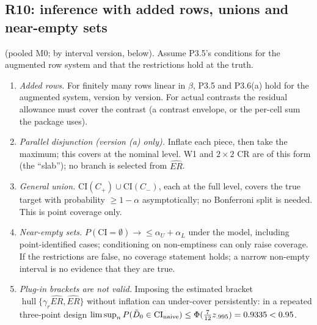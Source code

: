 \subsection{R10: inference with added rows, unions and near-empty sets}

\begin{result}\label{res:r10}
 (pooled M0; by interval version, below). Assume
P3.5's conditions for the augmented row system and that the restrictions hold at
the truth.
\begin{enumerate}[label=(\alph*),nosep]
\item \emph{Added rows.} For finitely many rows linear in $\beta$, P3.5 and
P3.6(a) hold for the augmented system, version by version. For actual contrasts
the residual allowance must cover the contrast (a contrast envelope, or the
per-cell sum the package uses).
\item \emph{Parallel disjunction (version (a) only).} Inflate each piece, then take
the maximum; this covers at the nominal level. W1 and $2\times2$ CR are of this
form (the ``slab''); no branch is selected from $\widehat{ER}$.
\item \emph{General union.} $\mathrm{CI}(C_+)\cup\mathrm{CI}(C_-)$, each at the
full level, covers the true target with probability $\ge1-\alpha$ asymptotically;
no Bonferroni split is needed. This is point coverage only.
\item \emph{Near-empty sets.} $P(\mathrm{CI}=\emptyset)\to\le\alpha_U+\alpha_L$
under the model, including point-identified cases; conditioning on non-emptiness
can only raise coverage. If the restrictions are false, no coverage statement
holds; a narrow non-empty interval is no evidence that they are true.
\item \emph{Plug-in brackets are not valid.} Imposing the estimated bracket
$\operatorname{hull}\{\gamma_r\widehat{ER},\widehat{ER}\}$ without inflation can
under-cover persistently: in a repeated three-point design
$\limsup_nP(\tilde D_0\in\mathrm{CI}_{\rm naive})\le\Phi(\tfrac7{12}z_{.995})=0.9335<0.95$.
\end{enumerate}
\end{result}

